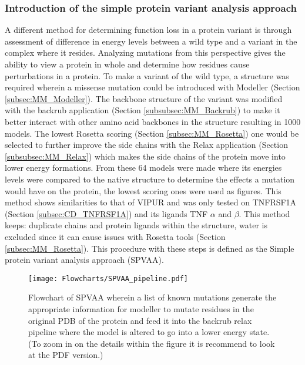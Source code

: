 	\subsubsection{Introduction of the simple protein variant analysis approach}
	A different method for determining function loss in a protein variant is through assessment of difference in energy levels between a wild type and a variant in the complex where it resides. Analyzing mutations from this perspective gives the ability to view a protein in whole and determine how residues cause perturbations in a protein. To make a variant of the wild type, a structure was required wherein a missense mutation could be introduced with Modeller (Section \ref{subsec:MM_Modeller}). The backbone structure of the variant was modified with the backrub application (Section \ref{subsubsec:MM_Backrub}) to make it better interact with other amino acid backbones in the structure resulting in 1000 models. The lowest Rosetta scoring (Section \ref{subsec:MM_Rosetta}) one would be selected to further improve the side chains with the Relax application	(Section \ref{subsubsec:MM_Relax}) which makes the side chains of the protein move into lower energy formations. From these 64 models were made where its energies levels were compared to the native structure to determine the effects a mutation would have on the protein, the lowest scoring ones were used as figures. This method shows similarities to that of VIPUR and was only tested on TNFRSF1A (Section \ref{subsec:CD_TNFRSF1A}) and its ligands TNF $\alpha$ and $\beta$. This method keeps: duplicate chains and protein ligands within the structure, water is excluded since it can cause issues with Rosetta tools (Section \ref{subsec:MM_Rosetta}). This procedure with these steps is defined as the Simple protein variant analysis approach (SPVAA).
	
	\begin{figure}[!ht]
		\centering
		\texttt{[image: Flowcharts/SPVAA\_pipeline.pdf]}
		\caption[Flowchart SPVAA pipeline]{Flowchart of SPVAA wherein a list of known mutations generate the appropriate information for modeller to mutate residues in the original PDB of the protein and feed it into the backrub relax pipeline where the model is altered to go into a lower energy state.(To zoom in on the details within the figure it is recommend to look at the PDF version.)}
	\end{figure}
	\newpage
	
